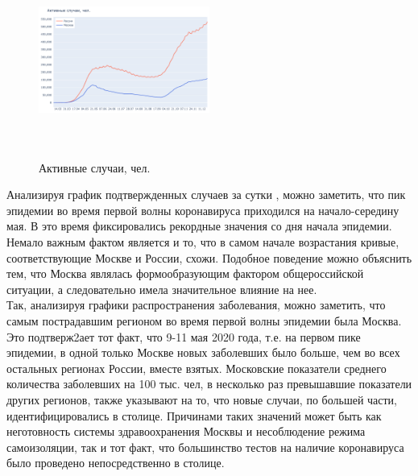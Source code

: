 \documentclass[a4paper, 12pt]{extarticle}
\begin{document}
\begin{figure}
    \centering
    \vspace{-20pt}
    \includegraphics[height=180pt, width=0.50\textwidth]{../plots/2active_cases_russia_moscow.pdf}
    \caption{Активные случаи, чел.}
    \label{fig:day_active_russia_moscow}
\end{figure}

Анализируя график подтвержденных случаев за сутки
, можно заметить, что пик эпидемии
во время первой волны коронавируса приходился на начало-середину мая. В это
время фиксировались рекордные значения со дня начала эпидемии. Немало важным
фактом является и то, что в самом начале возрастания кривые, соответствующие
Москве и России, схожи. Подобное поведение можно объяснить тем, что Москва
являлась формообразующим фактором общероссийской ситуации, а следовательно
имела значительное влияние на нее.
\\

Так, анализируя графики распространения заболевания, можно заметить, что самым
пострадавшим регионом во время первой волны эпидемии была Москва. Это
подтверж2ает тот факт, что 9-11 мая 2020 года, т.е. на первом пике эпидемии, в
одной только Москве новых заболевших было больше, чем во всех остальных
регионах России, вместе взятых. Московские показатели среднего количества
заболевших на 100 тыс. чел, в несколько раз превышавшие показатели других
регионов, также указывают на то, что новые случаи, по большей части,
идентифицировались в столице. Причинами таких значений может быть как
неготовность системы здравоохранения Москвы и несоблюдение режима самоизоляции,
так и тот факт, что большинство тестов на наличие коронавируса было проведено
непосредственно в столице.
\end{document}
